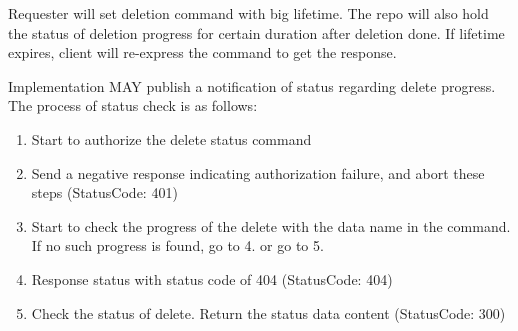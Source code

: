 \documentclass{acm_proc_article-sp}
\begin{document}
Requester will set deletion command with big lifetime. The repo will also hold the status of deletion progress for certain duration after deletion done. If lifetime expires, client will re-express the command to get the response.

Implementation MAY publish a notification of status regarding delete progress. The process of status check is as follows:

\begin{enumerate}[step 1]

\item Start to authorize the delete status command

\item Send a negative response indicating authorization failure, and abort these steps (StatusCode: 401)

\item Start to check the progress of the delete with the data name in the command. If no such progress is found, go to 4. or go to 5.

\item Response status with status code of 404 (StatusCode: 404)

\item Check the status of delete. Return the status data content (StatusCode: 300)

\end{enumerate}
\end{document}
